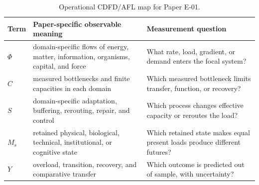 \documentclass[12pt,a4paper]{article}
\begin{document}
\begin{table}[htbp]
\centering
\small
\caption{Operational CDFD/AFL map for Paper E-01.}
\begin{tabularx}{\textwidth}{|l|X|X|}
\hline
\textbf{Term} & \textbf{Paper-specific observable meaning} & \textbf{Measurement question} \\
\hline
$\Phi$ & domain-specific flows of energy, matter, information, organisms, capital, and force & What rate, load, gradient, or demand enters the focal system? \\
\hline
$C$ & measured bottlenecks and finite capacities in each domain & Which measured bottleneck limits transfer, function, or recovery? \\
\hline
$S$ & domain-specific adaptation, buffering, rerouting, repair, and control & Which process changes effective capacity or reroutes the load? \\
\hline
$M_s$ & retained physical, biological, technical, institutional, or cognitive state & Which retained state makes equal present loads produce different futures? \\
\hline
$Y$ & overload, transition, recovery, and comparative transfer & Which outcome is predicted out of sample, with uncertainty? \\
\hline
\end{tabularx}
\end{table}
\end{document}
